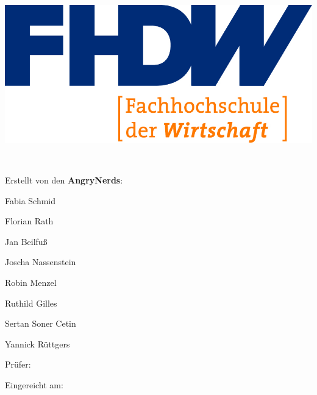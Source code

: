 
\begin{titlepage}

\begin{center}


\includegraphics[scale=1.20]{img/fhdw}\\

\vspace{.05cm}

\Huge{\bfseries\dokumententyp}


\LARGE{\dokumententitel}

~\vspace{.05cm}\\

\large{

Erstellt von den \textbf{AngryNerds}:\\\vspace{1mm}

Fabia Schmid

Florian Rath

Jan Beilfuß

Joscha Nassenstein

Robin Menzel

Ruthild Gilles

Sertan Soner Cetin

Yannick Rüttgers


\vspace{.5cm}

Prüfer:\vspace{1mm}\\

\dokumentenpruefer


\vspace{.5cm}

Eingereicht am:\vspace{1mm}\\

\abgabedatum

}

\end{center}


\end{titlepage}


